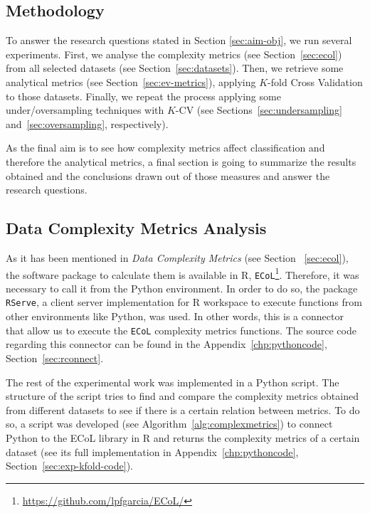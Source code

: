 \subsection{Methodology}

To answer the research questions stated in Section \ref{sec:aim-obj}, we run 
several experiments. First, we analyse the complexity metrics (see 
Section~\ref{sec:ecol}) from all selected datasets (see 
Section~\ref{sec:datasets}). Then, we retrieve some analytical metrics (see 
Section~\ref{sec:ev-metrics}), applying $K$-fold Cross
Validation to those datasets. Finally, we repeat the process applying some 
under/oversampling techniques with $K$-CV (see 
Sections~\ref{sec:undersampling} and~\ref{sec:oversampling}, respectively).

As the final aim is to see how complexity metrics affect classification and 
therefore the analytical metrics, a final section is going to summarize the 
results obtained and the conclusions drawn out of those measures and answer the 
research questions.

\subsection{Data Complexity Metrics Analysis}

As it has been mentioned in \textit{Data Complexity Metrics} (see 
Section ~\ref{sec:ecol}), the software package to calculate them is 
available in R, 
\texttt{ECoL}\footnote{\url{https://github.com/lpfgarcia/ECoL/}}. Therefore, it
was necessary to call it from the Python environment. In order to do so, the 
package \texttt{RServe}, a client server implementation for R workspace to 
execute functions from other environments like Python, was used. In other words, 
this is a connector that allow us to execute the \texttt{ECoL} complexity
metrics functions. The source code regarding this connector can be found in the 
Appendix~\ref{chp:pythoncode}, Section~\ref{sec:rconnect}.

The rest of the experimental work was implemented in a Python script. 
The structure of the script tries to find and compare the complexity metrics 
obtained from different datasets to see if there is a certain relation between 
metrics. To do so, a script was developed (see 
Algorithm~\ref{alg:complexmetrics}) to connect Python to the ECoL library in R 
and returns the complexity metrics of a certain dataset (see its full 
implementation in Appendix~\ref{chp:pythoncode}, 
Section~\ref{sec:exp-kfold-code}).

